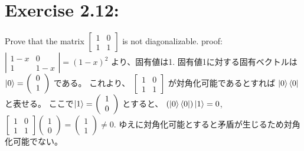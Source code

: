 \section{\Large Exercise 2.12:}Prove that the matrix 
$ \left[ \begin{array}{cc}
	1&0\\
	1&1
	\end{array}
\right]$
is not diagonalizable.
\newline
{\large proof:}
$\left| \begin{array}{cc}
	1-x&0\\
	1&1-x
	\end{array}
\right| = (1 - x)^2$
より、固有値は1.
固有値1に対する固有ベクトルは
$\ket{0} = 
\left( \begin{array}{c}
	0\\
	1
	\end{array}
\right)
$
である。
これより、
$ \left[ \begin{array}{cc}
	1&0\\
	1&1
	\end{array}
\right]$
が対角化可能であるとすれば
$\ket{0}\bra{0}$と表せる。
ここで$\ket{1} = 
\left( \begin{array}{c}
	1\\
	0
	\end{array}
\right)
$
とすると、
$(\ket{0}\bra{0})\ket{1} = 0$,
$ \left[ \begin{array}{cc}
	1&0\\
	1&1
	\end{array}
\right] 
\left( \begin{array}{c}
	1\\
	0
	\end{array}
\right)
=\left( \begin{array}{c}
	1\\
	1
	\end{array}
\right)
\neq 0.$
ゆえに対角化可能とすると矛盾が生じるため対角化可能でない。

